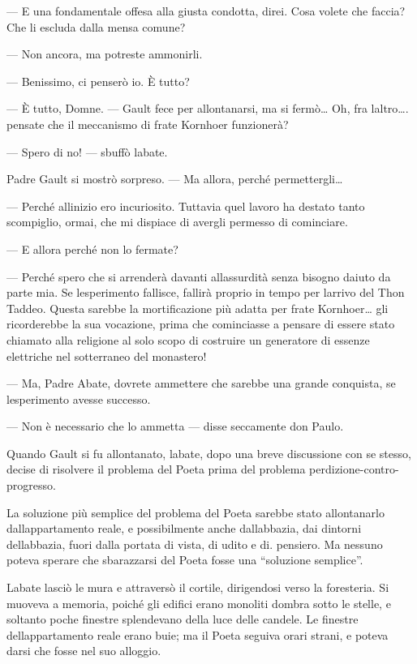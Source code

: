--- E una fondamentale offesa alla giusta condotta, direi. Cosa volete
che faccia? Che li escluda dalla mensa comune?

--- Non ancora, ma potreste ammonirli.

--- Benissimo, ci penserò io. È tutto?

--- È tutto, Domne. --- Gault fece per allontanarsi, ma si fermò\ldots{}
Oh, fra l\textquotesingle altro\ldots. pensate che il meccanismo di
frate Kornhoer funzionerà?

--- Spero di no! --- sbuffò l\textquotesingle abate.

Padre Gault si mostrò sorpreso. --- Ma allora, perché
permettergli\ldots{}

--- Perché all\textquotesingle inizio ero incuriosito. Tuttavia quel
lavoro ha destato tanto scompiglio, ormai, che mi dispiace di avergli
permesso di cominciare.

--- E allora perché non lo fermate?

--- Perché spero che si arrenderà davanti all\textquotesingle assurdità
senza bisogno d\textquotesingle aiuto da parte mia. Se
l\textquotesingle esperimento fallisce, fallirà proprio in tempo per
l\textquotesingle arrivo del Thon Taddeo. Questa sarebbe la
mortificazione più adatta per frate Kornhoer\ldots{} gli ricorderebbe la
sua vocazione, prima che cominciasse a pensare di essere stato chiamato
alla religione al solo scopo di costruire un generatore di essenze
elettriche nel sotterraneo del monastero!

--- Ma, Padre Abate, dovrete ammettere che sarebbe una grande conquista,
se l\textquotesingle esperimento avesse successo.

--- Non è necessario che lo ammetta --- disse seccamente don Paulo.

Quando Gault si fu allontanato, l\textquotesingle abate, dopo una breve
discussione con se stesso, decise di risolvere il problema del Poeta
prima del problema perdizione-contro-progresso.

La soluzione più semplice del problema del Poeta sarebbe stato
allontanarlo dall\textquotesingle appartamento reale, e possibilmente
anche dall\textquotesingle abbazia, dai dintorni
dell\textquotesingle abbazia, fuori dalla portata di vista, di udito e
di. pensiero. Ma nessuno poteva sperare che sbarazzarsi del Poeta fosse
una ``soluzione semplice''.

L\textquotesingle abate lasciò le mura e attraversò il cortile,
dirigendosi verso la foresteria. Si muoveva a memoria, poiché gli
edifici erano monoliti d\textquotesingle ombra sotto le stelle, e
soltanto poche finestre splendevano della luce delle candele. Le
finestre dell\textquotesingle appartamento reale erano buie; ma il Poeta
seguiva orari strani, e poteva darsi che fosse nel suo alloggio.

